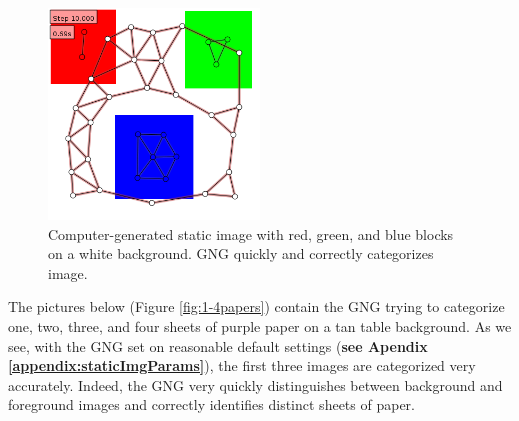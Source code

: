 \documentclass{article}
\renewcommand{\|}{\origbar} %
\begin{document}
\begin{figure}[h!]
  \begin{center}
    \includegraphics[width=0.5\textwidth]{rgb_static.png}
  \end{center}
  \caption{Computer-generated static image with red, green, and blue blocks on a white background. GNG quickly and correctly categorizes image.}
  \label{fig:rgbStatic}
\end{figure}

The pictures below (Figure \ref{fig:1-4papers}) contain the GNG trying to categorize one, two, three, and four sheets of purple paper on a tan table background. As we see, with the GNG set on reasonable default settings ({\bf see Apendix \ref{appendix:staticImgParams}}), the first three images are categorized very accurately. Indeed, the GNG very quickly distinguishes between background and foreground images and correctly identifies distinct sheets of paper. 
\end{document}
